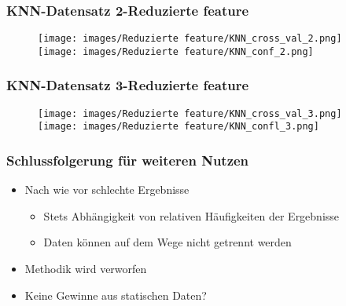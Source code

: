 \documentclass[utf8x, xcolor=dvipsnames]{beamer}
\begin{document}
\begin{frame}
\frametitle{KNN-Datensatz 2-Reduzierte feature}
\begin{figure}
	\texttt{[image: images/Reduzierte feature/KNN\_cross\_val\_2.png]}
	\texttt{[image: images/Reduzierte feature/KNN\_conf\_2.png]}
\end{figure}
\end{frame}

\begin{frame}
\frametitle{KNN-Datensatz 3-Reduzierte feature}
\begin{figure}
	\texttt{[image: images/Reduzierte feature/KNN\_cross\_val\_3.png]}
	\texttt{[image: images/Reduzierte feature/KNN\_confl\_3.png]}
\end{figure}
\end{frame}

\begin{frame}
\frametitle{Schlussfolgerung für weiteren Nutzen}
\begin{itemize}
	\item Nach wie vor schlechte Ergebnisse
		\begin{itemize}
		\item Stets Abhängigkeit von relativen Häufigkeiten der Ergebnisse
		\item Daten können auf dem Wege nicht getrennt werden\newline
	\end{itemize}
	\item Methodik wird verworfen\newline
	\item Keine Gewinne aus statischen Daten?
\end{itemize}
\end{frame}
\end{document}
